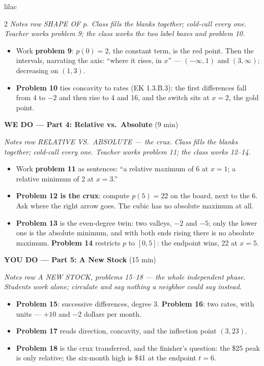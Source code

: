 \documentclass[10pt]{article}
\begin{document}
\begin{skillbox}{lilac}
\begin{multicols}{2}
\textit{Notes row SHAPE OF $p$. Class fills the blanks together; cold-call every one. Teacher
works problem 9; the class works the two label boxes and problem 10.}
\begin{itemize}
  \item Work \textbf{problem 9}: $p(0) = 2$, the constant term, is the red point. Then the
        intervals, narrating the axis: ``where it rises, in $x$'' --- $(-\infty, 1)$ and
        $(3, \infty)$; decreasing on $(1, 3)$.
  \item \textbf{Problem 10} ties concavity to rates (EK 1.3.B.3): the first differences fall
        from 4 to $-2$ and then rise to 4 and 16, and the switch sits at $x = 2$, the gold point.
\end{itemize}

\textbf{WE DO --- Part 4: Relative vs.\ Absolute} (9 min)

\textit{Notes row RELATIVE VS.\ ABSOLUTE --- the crux. Class fills the blanks together;
cold-call every one. Teacher works problem 11; the class works 12--14.}
\begin{itemize}
  \item Work \textbf{problem 11} as sentences: ``a relative maximum of 6 at $x = 1$; a
        relative minimum of 2 at $x = 3$.''
  \item \textbf{Problem 12 is the crux}: compute $p(5) = 22$ on the board, next to the 6. Ask
        where the right arrow goes. The cubic has no absolute maximum at all.
  \item \textbf{Problem 13} is the even-degree twin: two valleys, $-2$ and $-5$; only the
        lower one is the absolute minimum, and with both ends rising there is no absolute
        maximum. \textbf{Problem 14} restricts $p$ to $[0, 5]$: the endpoint wins, 22 at $x = 5$.
\end{itemize}

\textbf{YOU DO --- Part 5: A New Stock} (15 min)

\textit{Notes row A NEW STOCK, problems 15--18 --- the whole independent phase. Students work
alone; circulate and say nothing a neighbor could say instead.}
\begin{itemize}
  \item \textbf{Problem 15}: successive differences, degree 3. \textbf{Problem 16}: two rates,
        with units --- $+10$ and $-2$ dollars per month.
  \item \textbf{Problem 17} reads direction, concavity, and the inflection point $(3, 23)$.
  \item \textbf{Problem 18} is the crux transferred, and the finisher's question: the \$25 peak
        is only relative; the six-month high is \$41 at the endpoint $t = 6$.
\end{itemize}
\end{multicols}
\end{skillbox}
\end{document}

